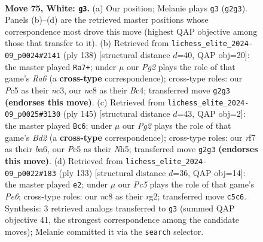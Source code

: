 \documentclass[11pt]{article}
\begin{document}
\clearpage

\begin{figure}[p]\centering
\begin{subfigure}{0.46\textwidth}\centering
\resizebox{\linewidth}{!}{%
\newchessgame
\chessboard[
  setfen={1Rnk4/5r2/P7/2P4p/8/2pB3P/2P1K1P1/8 w - - 2 75},
  showmover=false,
  pgfstyle=straightmove, color=movearrow, markmove={g2-g3}
]}
\caption{}
\end{subfigure}\hfill
\begin{subfigure}{0.46\textwidth}\centering
\resizebox{\linewidth}{!}{%
\newchessgame
\chessboard[
  setfen={8/6k1/R7/5pp1/2Br4/1Pn3KP/8/8 w - - 7 70},
  showmover=false,
  pgfstyle=straightmove, color=movearrow, markmove={a6-a7}
]}
\caption{}
\end{subfigure}
\\[4pt]
\begin{subfigure}{0.46\textwidth}\centering
\resizebox{\linewidth}{!}{%
\newchessgame
\chessboard[
  setfen={8/3b4/BP1k4/3N1ppn/p2K4/7P/8/8 b - - 0 73},
  showmover=false,
  pgfstyle=straightmove, color=movearrow, markmove={d7-c6}
]}
\caption{}
\end{subfigure}\hfill
\begin{subfigure}{0.46\textwidth}\centering
\resizebox{\linewidth}{!}{%
\newchessgame
\chessboard[
  setfen={8/8/p4k2/2P1b3/5p2/4pP1K/3r2R1/8 b - - 4 67},
  showmover=false,
  pgfstyle=straightmove, color=movearrow, markmove={e3-e2}
]}
\caption{}
\end{subfigure}
\caption{\textbf{Move 75, White: \texttt{g3}.} (a) Our position; Melanie plays \texttt{g3} (\texttt{g2g3}). Panels (b)--(d) are the retrieved master positions whose correspondence most drove this move (highest QAP objective among those that transfer to it). (b) Retrieved from \texttt{lichess\_elite\_2024-09\_p0024\#2141} (ply 138) [structural distance $d$=40, QAP obj=20]: the master played \texttt{Ra7+}; under $\mu$ our \emph{Pg2} plays the role of that game's \emph{Ra6} (a \textbf{cross-type} correspondence); cross-type roles: our \emph{P}c5 as their \emph{n}c3, our \emph{n}c8 as their \emph{B}c4; transferred move \texttt{g2g3} \textbf{(endorses this move)}. (c) Retrieved from \texttt{lichess\_elite\_2024-09\_p0025\#3130} (ply 145) [structural distance $d$=43, QAP obj=2]: the master played \texttt{Bc6}; under $\mu$ our \emph{Pg2} plays the role of that game's \emph{Bd2} (a \textbf{cross-type} correspondence); cross-type roles: our \emph{r}f7 as their \emph{b}a6, our \emph{P}c5 as their \emph{N}h5; transferred move \texttt{g2g3} \textbf{(endorses this move)}. (d) Retrieved from \texttt{lichess\_elite\_2024-09\_p0022\#183} (ply 133) [structural distance $d$=36, QAP obj=14]: the master played \texttt{e2}; under $\mu$ our \emph{Pc5} plays the role of that game's \emph{Pe6}; cross-type roles: our \emph{n}c8 as their \emph{r}g2; transferred move \texttt{c5c6}. Synthesis: 3 retrieved analogs transferred to \texttt{g3} (summed QAP objective 41, the strongest correspondence among the candidate moves); Melanie committed it via the \texttt{search} selector.}
\label{fig:thought-m148}
\end{figure}
\end{document}
